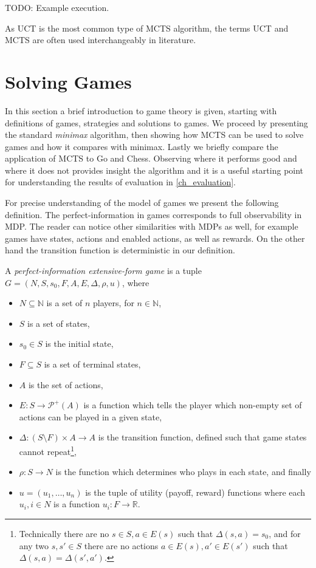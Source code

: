 TODO: Example execution.

As UCT is the most common type of MCTS algorithm, the terms UCT and MCTS
are often used interchangeably in literature.

\section{Solving Games}

In this section a brief introduction to game theory is given, starting
with definitions of games, strategies and solutions to games. We
proceed by presenting the standard {\em minimax} algorithm, then showing
how MCTS can be used to solve games and how it compares with minimax.
Lastly we briefly compare the application of MCTS to Go and Chess.
Observing where it performs good and where it does not provides insight
the algorithm and it is a useful starting point for understanding the results
of evaluation in \autoref{ch_evaluation}.

For precise understanding of the model of games we present the following
definition.  The perfect-information in games corresponds to full
observability in MDP.  The reader can notice other similarities with
MDPs as well, for example games have states, actions and enabled
actions, as well as rewards. On the other hand the transition function
is deterministic in our definition.

\begin{definition}
    A {\em perfect-information extensive-form game}
    is a tuple $G = (N, S, s_0, F, A, E, \Delta, \rho, u)$,
    where
    \begin{itemize}
        \item $N \subseteq \mathbb{N}$ is a set of $n$ players,
            for $n \in \mathbb{N}$,
        \item $S$ is a set of states,
        \item $s_0 \in S$ is the initial state,
        \item $F \subseteq S$ is a set of terminal states,
        \item $A$ is the set of actions,
        \item $E : S \to \mathcal{P}^+(A)$ is a function which tells the player
            which non-empty set of actions can be played in a given state,
        \item $\Delta : (S \setminus F) \times A \to A$ is the
            transition function, defined such that game states cannot
            repeat\footnote{
                Technically there are no $s \in S, a \in E(s)$ such that
                $\Delta(s,a) = s_0$, and for any two $s,s' \in S$ there
                are no actions $a \in E(s), a' \in E(s')$ such that
                $\Delta(s,a) = \Delta(s',a')$.
            },
        \item $\rho : S \to N$ is the function which determines who plays in each state,
            and finally
        \item $u = (u_1,\ldots,u_{n})$ is the tuple of
            utility (payoff, reward) functions where each $u_i, i \in N$
            is a function $u_i : F \to \mathbb{R}$.
    \end{itemize}
\end{definition}

